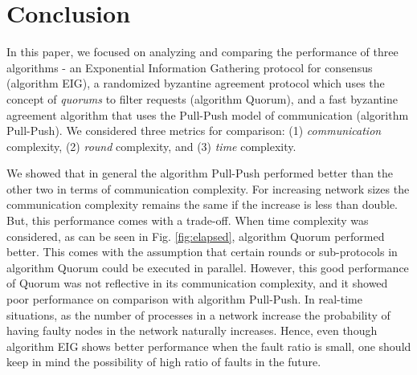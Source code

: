 ﻿\section{Conclusion}
\label{sec:conc}

In this paper, we focused on analyzing and comparing the performance of three algorithms - an Exponential Information Gathering protocol for consensus \cite{KM13} (algorithm EIG), a randomized byzantine agreement protocol which uses the concept of \textit{quorums} to filter requests \cite{BPV06} (algorithm Quorum), and a fast byzantine agreement algorithm that uses the Pull-Push model of communication \cite{BGH13} (algorithm Pull-Push). We considered three metrics for comparison: (1) \textit{communication} complexity, (2) \textit{round} complexity, and (3) \textit{time} complexity. 

We showed that in general the algorithm Pull-Push performed better than the other two in terms of communication complexity. For increasing network sizes the communication complexity remains the same if the increase is less than double. But, this performance comes with a trade-off. When time complexity was considered, as can be seen in Fig. \ref{fig:elapsed}, algorithm Quorum performed better. This comes with the assumption that certain rounds or sub-protocols in algorithm Quorum could be executed in parallel. However, this good performance of Quorum was not reflective in its communication complexity, and it showed poor performance on comparison with algorithm Pull-Push. In real-time situations, as the number of processes in a network increase the probability of having faulty nodes in the network naturally increases. Hence, even though algorithm EIG shows better performance when the fault ratio is small, one should keep in mind the possibility of high ratio of faults in the future.

